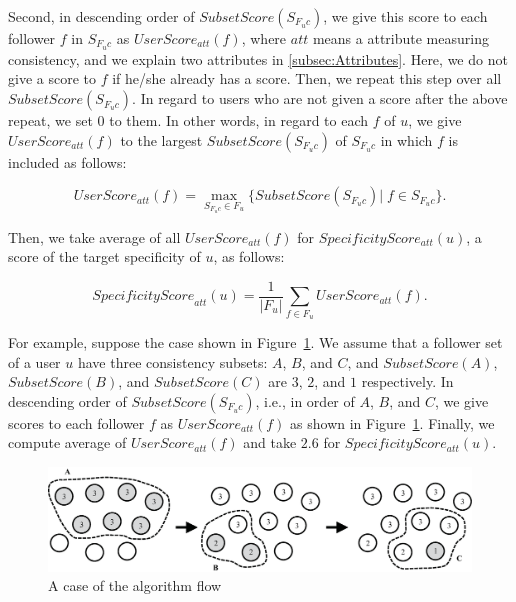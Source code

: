 Second, in descending order of $\mathit{SubsetScore}(S_{F_uc})$, we give
this score to each follower $f$ in $S_{F_uc}$ as
$\mathit{UserScore}_{\mathit{att}}(f)$, where $\mathit{att}$ means a
attribute measuring consistency, and we explain two attributes in
\ref{subsec:Attributes}. Here, we do not give a score to $f$ if
he/she already has a score. Then, we repeat this step over all
$\mathit{SubsetScore}(S_{F_uc})$.  In regard to users who are not given
a score after the above repeat, we set $0$ to them.  In other words, in
regard to each $f$ of $u$, we give
$\mathit{UserScore}_{\mathit{att}}(f)$ to the largest
$\mathit{SubsetScore}(S_{F_uc})$ of $S_{F_uc}$ in which $f$ is included
as follows:

\vspace{-1ex}
\[
 \mathit{UserScore}_{\mathit{att}}(f) = \max_{S_{F_uc} \in F_u}
 \{\mathit{SubsetScore}(S_{F_uc})|\;f \in S_{F_uc}\}.
\]
\vspace{-2ex}

Then, we take average of all $\mathit{UserScore_{\mathit{att}}(f)}$ for
$\mathit{SpecificityScore_{\mathit{att}}(u)}$, a score of the target
specificity of $u$, as follows:

\vspace{-1ex}
\[
 \mathit{SpecificityScore}_{\mathit{att}}(u) = \frac{1}{|F_u|}
 \sum_{f \in F_u} \mathit{UserScore}_{\mathit{att}}(f).
\]
\vspace{-2ex}

For example, suppose the case shown in Figure~\ref{fig:Algorithm}.
We assume that a follower set of a user $u$ have three consistency
subsets: $A$, $B$, and $C$, and $\mathit{SubsetScore}(A)$,
$\mathit{SubsetScore}(B)$, and $\mathit{SubsetScore}(C)$ are $3$, $2$,
and $1$ respectively.  In descending order of
$\mathit{SubsetScore}(S_{F_uc})$, i.e., in order of $A$, $B$, and $C$,
we give scores to each follower $f$ as
$\mathit{UserScore}_{\mathit{att}}(f)$ as shown in
Figure~\ref{fig:Algorithm}.  Finally, we compute average of
$\mathit{UserScore}_{\mathit{att}}(f)$ and take $2.6$ for
$\mathit{SpecificityScore_{\mathit{att}}(u)}$.

{\footnotesize
\begin{figure}[t]
\begin{center}
\includegraphics[width=14cm]{images/algorithm.eps}
 \caption{A case of the algorithm flow}
\label{fig:Algorithm}
\end{center}
\end{figure}
}

